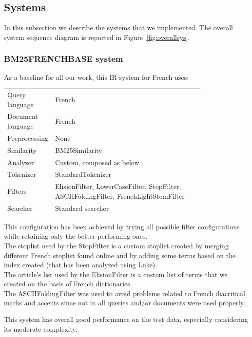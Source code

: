\subsection{Systems}
\label{subsec:systems}
In this subsection we describe the systems that we implemented. The overall system sequence diagram is reported in Figure~\ref{fig:overallsys}.



\subsubsection{BM25FRENCHBASE system}
\label{subsub:BM25FRENCHBASE}
As a baseline for all our work, this IR system for French uses:
\begin{table}[h!]
    \centering
    \begin{tabular}{l p{0.8\linewidth}}
    Query language & French\\
    Document language & French\\
    Preprocessing & None\\
    Similarity & BM25Similarity\\
    Analyzer & Custom, composed as below\\
    Tokenizer & StandardTokenizer\\
    Filters & ElisionFilter, LowerCaseFilter, StopFilter, ASCIIFoldingFilter, FrenchLightStemFilter\\
    Searcher & Standard searcher
    \end{tabular}
\end{table}
\par This configuration has been achieved by trying all possible filter configurations while retaining only the better performing ones.
\\
The stoplist used by the StopFilter is a custom stoplist created by merging different French stoplist found online and by adding some terms based on the index created (that has been analyzed using Luke).
\\ 
The article's list used by the ElisionFilter is a custom list of terms that we created on the basis of French dictionaries. 
\\
The ASCIIFoldingFilter was used to avoid problems related to French diacritical marks and accents since not in all queries and/or documents were used properly.
\par
This system has overall good performance on the test data, especially considering its moderate complexity.

